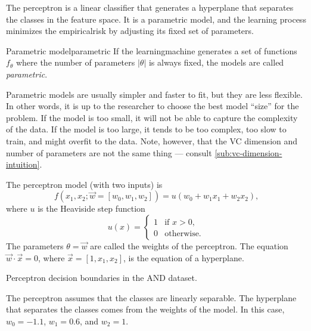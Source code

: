 The perceptron is a linear \gls{classifier} that generates a hyperplane that separates the
classes in the feature space.  It is a parametric model, and the learning process minimizes the \gls{empiricalrisk}
by adjusting its fixed set of parameters.

\begin{defbox}{Parametric model}{parametric}
  If the \gls{learningmachine} generates a set of functions $f_\theta$ where the number of
  parameters $|\theta|$ is always fixed, the models are called \emph{parametric}.
\end{defbox}

Parametric models are usually simpler and faster to fit, but they are less flexible.  In
other words, it is up to the researcher to choose the best model ``size'' for the problem.
If the model is too small, it will not be able to capture the complexity of the data.  If
the model is too large, it tends to be too complex, too slow to train, and might overfit to
the data.  Note, however, that the VC dimension and number of parameters are not the same
thing --- consult \cref{sub:vc-dimension-intuition}.

The perceptron model (with two inputs) is
\begin{equation*}
  f(x_1, x_2; \vec{w} = \left[w_0, w_1, w_2\right]) = u(w_0 + w_1 x_1 + w_2 x_2)\text{,}
\end{equation*}
where $u$ is the Heaviside step function
\begin{equation*}
  u(x) = \begin{cases}
    1 & \text{if } x > 0\text{,} \\
    0 & \text{otherwise.}
  \end{cases}
\end{equation*}
The parameters $\theta = \vec{w}$ are called the weights of the perceptron.
The equation $\vec{w} \cdot \vec{x} = 0$, where $\vec{x} = [1, x_1,
x_2]$, is the equation of a hyperplane.

\begin{figurebox}[label=fig:perceptron-and]{Perceptron decision boundaries in the AND dataset.}
  \centering
  \tcblower
  The perceptron assumes that the classes are linearly separable.
  The hyperplane that separates the classes comes from the weights of the model.
  In this case, $w_0 = -1.1$, $w_1 = 0.6$, and $w_2 = 1$.
\end{figurebox}

